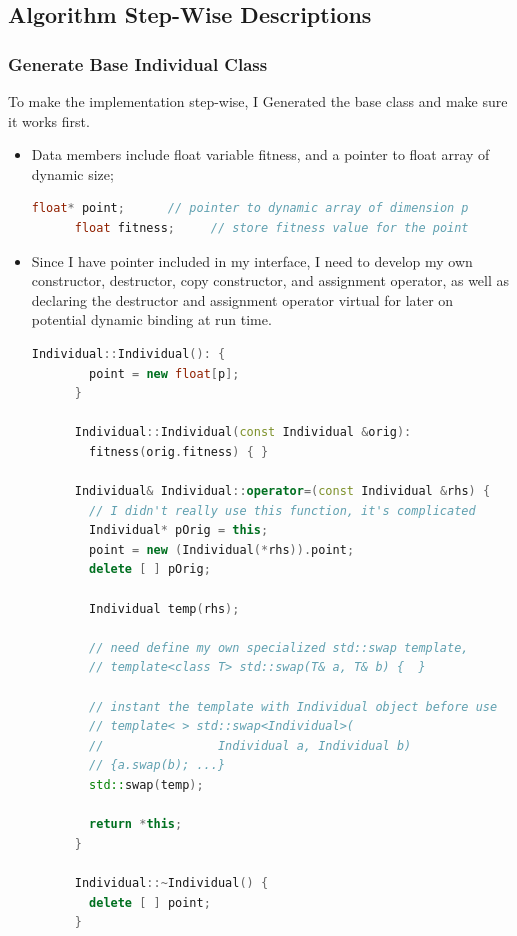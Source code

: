 \documentclass{article}
\begin{document}
\begin{CJK}{UTF8}{gbsn}
\subsection{Algorithm Step-Wise Descriptions}

\subsubsection{Generate Base Individual Class}
To make the implementation step-wise, I Generated the base class and make sure it works first.
  \begin{itemize}
    \itemsep=-3pt

  \item Data members include float variable fitness, and a pointer to float array of dynamic size;
    \begin{lstlisting}[language=c++]
      float* point;      // pointer to dynamic array of dimension p
      float fitness;     // store fitness value for the point
    \end{lstlisting}

  \item Since I have pointer included in my interface, I need to develop my own constructor, destructor, copy constructor, and assignment operator, as well as declaring the destructor and assignment operator virtual for later on potential dynamic binding at run time. 
    \begin{lstlisting}[language=c++]
      Individual::Individual(): {
        point = new float[p];
      }

      Individual::Individual(const Individual &orig): 
      	fitness(orig.fitness) { }

      Individual& Individual::operator=(const Individual &rhs) {
        // I didn't really use this function, it's complicated
        Individual* pOrig = this;
        point = new (Individual(*rhs)).point;
        delete [ ] pOrig;

        Individual temp(rhs);

        // need define my own specialized std::swap template,
        // template<class T> std::swap(T& a, T& b) {  }
        
        // instant the template with Individual object before use
        // template< > std::swap<Individual>(
        //	              Individual a, Individual b)
        // {a.swap(b); ...}
        std::swap(temp);
        
        return *this;
      }

      Individual::~Individual() {
        delete [ ] point;
      }
    \end{lstlisting}


\end{itemize}
\end{CJK}
\end{document}
